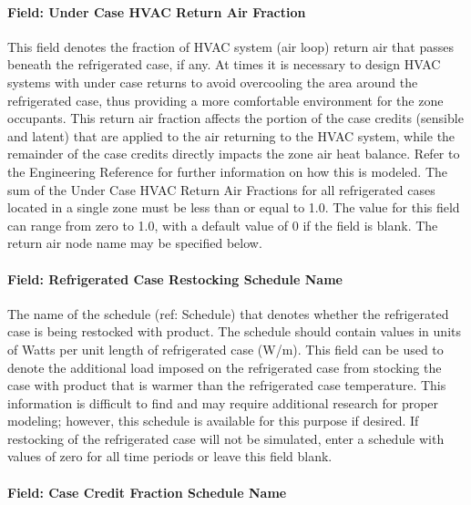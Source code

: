 \paragraph{Field: Under Case HVAC Return Air Fraction}\label{field-under-case-hvac-return-air-fraction}

This field denotes the fraction of HVAC system (air loop) return air that passes beneath the refrigerated case, if any. At times it is necessary to design HVAC systems with under case returns to avoid overcooling the area around the refrigerated case, thus providing a more comfortable environment for the zone occupants. This return air fraction affects the portion of the case credits (sensible and latent) that are applied to the air returning to the HVAC system, while the remainder of the case credits directly impacts the zone air heat balance. Refer to the Engineering Reference for further information on how this is modeled. The sum of the Under Case HVAC Return Air Fractions for all refrigerated cases located in a single zone must be less than or equal to 1.0. The value for this field can range from zero to 1.0, with a default value of 0 if the field is blank. The return air node name may be specified below.

\paragraph{Field: Refrigerated Case Restocking Schedule Name}\label{field-refrigerated-case-restocking-schedule-name}

The name of the schedule (ref: Schedule) that denotes whether the refrigerated case is being restocked with product. The schedule should contain values in units of Watts per unit length of refrigerated case (W/m). This field can be used to denote the additional load imposed on the refrigerated case from stocking the case with product that is warmer than the refrigerated case temperature. This information is difficult to find and may require additional research for proper modeling; however, this schedule is available for this purpose if desired. If restocking of the refrigerated case will not be simulated, enter a schedule with values of zero for all time periods or leave this field blank.

\paragraph{Field: Case Credit Fraction Schedule Name}\label{field-case-credit-fraction-schedule-name}

